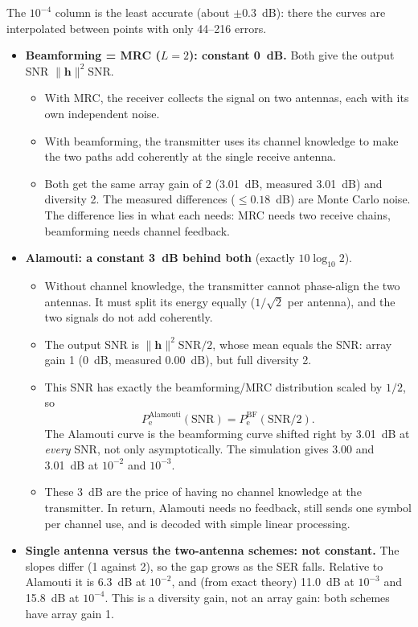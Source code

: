 \documentclass[11pt,a4paper]{article}
\newcommand{\snr}{\mathrm{SNR}}
\newcommand{\norm}[1]{\lVert #1 \rVert}
\newcommand{\Pe}{P_{\mathrm{e}}}
\newcommand{\h}{\mathbf{h}}
\begin{document}
The $10^{-4}$ column is the least accurate (about $\pm0.3$~dB): there the curves
are interpolated between points with only 44--216 errors.

\begin{itemize}
  \item \textbf{Beamforming = MRC ($L = 2$): constant 0~dB.} Both give the output SNR
        $\norm{\h}^2\snr$.
        \begin{itemize}
          \item With MRC, the receiver collects the signal on two antennas, each with
                its own independent noise.
          \item With beamforming, the transmitter uses its channel knowledge to make
                the two paths add coherently at the single receive antenna.
          \item Both get the same array gain of 2 (3.01~dB, measured 3.01~dB) and
                diversity 2. The measured differences ($\le 0.18$~dB) are Monte Carlo
                noise. The difference lies in what each needs: MRC needs two receive
                chains, beamforming needs channel feedback.
        \end{itemize}
  \item \textbf{Alamouti: a constant 3~dB behind both} (exactly $10\log_{10}2$).
        \begin{itemize}
          \item Without channel knowledge, the transmitter cannot phase-align the two
                antennas. It must split its energy equally ($1/\sqrt2$ per antenna), and
                the two signals do not add coherently.
          \item The output SNR is $\norm{\h}^2\snr/2$, whose mean equals the SNR: array
                gain 1 (0~dB, measured 0.00~dB), but full diversity 2.
          \item This SNR has exactly the beamforming/MRC distribution scaled by
                $1/2$, so
                \begin{equation*}
                  \Pe^{\mathrm{Alamouti}}(\snr) = \Pe^{\mathrm{BF}}(\snr/2).
                \end{equation*}
                The Alamouti curve is the beamforming curve shifted right by 3.01~dB at
                \emph{every} SNR, not only asymptotically. The simulation gives
                3.00 and 3.01~dB at $10^{-2}$ and $10^{-3}$.
          \item These 3~dB are the price of having no channel knowledge at the
                transmitter. In return, Alamouti needs no feedback, still sends one
                symbol per channel use, and is decoded with simple linear processing.
        \end{itemize}
  \item \textbf{Single antenna versus the two-antenna schemes: not constant.} The
        slopes differ (1 against 2), so the gap grows as the SER falls. Relative to
        Alamouti it is 6.3~dB at $10^{-2}$, and (from exact theory) 11.0~dB at
        $10^{-3}$ and 15.8~dB at $10^{-4}$. This is a diversity gain, not an array
        gain: both schemes have array gain 1.
\end{itemize}
\end{document}
